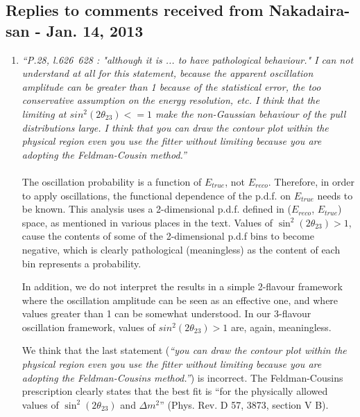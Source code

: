 \subsection{
  Replies to comments received from Nakadaira-san - Jan. 14, 2013 }

\begin{enumerate}

\vspace{5 mm}
\item
{\em
  ``P.28, l.626~628 : "although it is ... to have pathological behaviour."
  I can not understand at all for this statement, because the apparent
  oscillation amplitude can be greater than 1 because of the statistical
  error, the too conservative assumption on the energy resolution, etc.
  I think that the limiting at $sin^2(2\theta_{23})<=1$ make the non-Gaussian
  behaviour of the pull distributions large.
  I think that you can draw the contour plot within the physical region
  even you use the fitter without limiting because you are adopting the
  Feldman-Cousin method.''
}\\
\\
The oscillation probability is a function of $E_{true}$, not $E_{reco}$.
Therefore, in order to apply oscillations, the functional dependence of the p.d.f. on $E_{true}$
needs to be known.
This analysis uses a 2-dimensional p.d.f. defined in ($E_{reco}$, $E_{true}$) space,
as mentioned in various places in the text.
Values of $\sin^2(2\theta_{23})>1$, cause the contents of some of the 2-dimensional p.d.f
bins to become negative, which is clearly pathological (meaningless) 
as the content of each bin represents a probability. 

In addition, we do not interpret the results in a simple 2-flavour framework where
the oscillation amplitude can be seen as an effective one,
and where values greater than 1 can be somewhat understood.
In our 3-flavour oscillation framework, values of $sin^2(2\theta_{23})>1$ are, again,
meaningless.

We think that the last statement ({\em ``you can draw the contour plot within the physical region
even you use the fitter without limiting because you are adopting the
Feldman-Cousins method.''}) is incorrect. The Feldman-Cousins prescription 
clearly states that the best fit is ``for the physically allowed values of 
$\sin^2(2\theta_{23})$ and $\Delta m^{2}$'' (Phys. Rev. D 57, 3873, section 
V B).


\end{enumerate}
